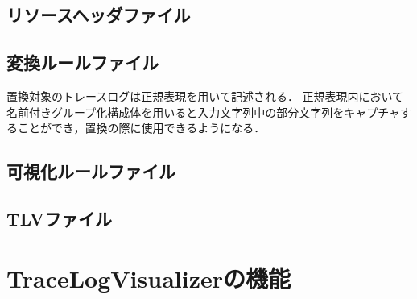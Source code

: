 \subsection{リソースヘッダファイル}
\label{subsec:reshFile}

\subsection{変換ルールファイル}
\label{subsec:cnvFile}

置換対象のトレースログは正規表現を用いて記述される．
正規表現内において名前付きグループ化構成体を用いると入力文字列中の部分文字列をキャプチャすることができ，置換の際に使用できるようになる．

\subsection{可視化ルールファイル}

\subsection{TLVファイル}

\section{TraceLogVisualizerの機能}